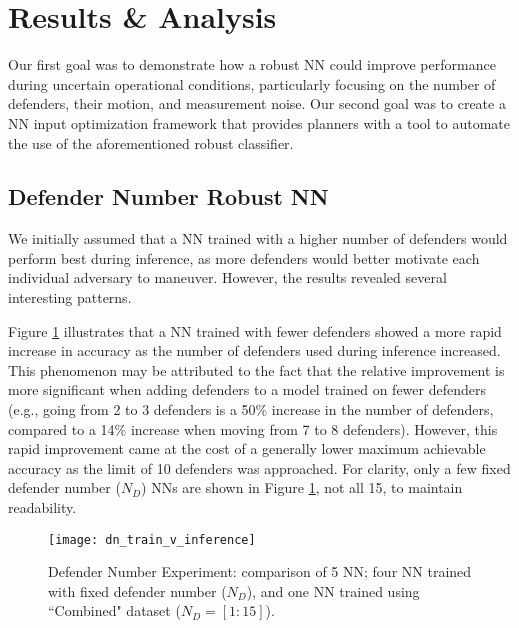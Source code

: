 \documentclass[journal]{IEEEtran} %
\begin{document}
\section{Results \& Analysis}
\label{sec:results}



Our first goal was to demonstrate how a robust NN could improve performance during uncertain operational conditions, particularly focusing on the number of defenders, their motion, and measurement noise. Our second goal was to create a NN input optimization framework that provides planners with a tool to automate the use of the aforementioned robust classifier.


\subsection{Defender Number Robust NN}


We initially assumed that a NN trained with a higher number of defenders would perform best during inference, as more defenders would better motivate each individual adversary to maneuver. However, the results revealed several interesting patterns.

Figure \ref{fig:dn_train_v_inference} illustrates that a NN trained with fewer defenders showed a more rapid increase in accuracy as the number of defenders used during inference increased. This phenomenon may be attributed to the fact that the relative improvement is more significant when adding defenders to a model trained on fewer defenders (e.g., going from 2 to 3 defenders is a 50\% increase in the number of defenders, compared to a 14\% increase when moving from 7 to 8 defenders). However, this rapid improvement came at the cost of a generally lower maximum achievable accuracy as the limit of 10 defenders was approached. For clarity, only a few fixed defender number ($N_D$) NNs are shown in Figure \ref{fig:dn_train_v_inference}, not all 15, to maintain readability.

\begin{figure}[h]
    \centering
    \texttt{[image: dn\_train\_v\_inference]}
    \caption{Defender Number Experiment: comparison of 5 NN; four NN trained with fixed defender number ($N_D$), and one NN trained using ``Combined" dataset ($N_D=[1:15]$).}
    \label{fig:dn_train_v_inference}
\end{figure}
\end{document}
